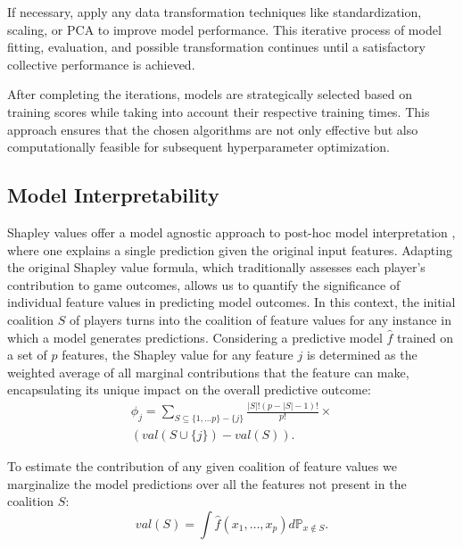 \documentclass{IEEEtran}
\begin{document}
            If necessary, apply any data transformation techniques like standardization, scaling, or PCA to improve model performance. This iterative process of model fitting, evaluation, and possible transformation continues until a satisfactory collective performance is achieved.

            After completing the iterations, models are strategically selected based on training scores while taking into account their respective training times. This approach ensures that the chosen algorithms are not only effective but also computationally feasible for subsequent hyperparameter optimization.

        \subsection{Model Interpretability} \label{sec:interpretability}

            Shapley values offer a model agnostic approach to post-hoc model interpretation \cite{chen2023algorithms}, where one explains a single prediction given the original input features. Adapting the original Shapley value formula, which traditionally assesses each player's contribution to game outcomes, allows us to quantify the significance of individual feature values in predicting model outcomes. In this context, the initial coalition $S$ of players turns into the coalition of feature values for any instance in which a model generates predictions. Considering a predictive model $\hat{f}$ trained on a set of $p$ features, the Shapley value for any feature $j$ is determined as the weighted average of all marginal contributions that the feature can make, encapsulating its unique impact on the overall predictive outcome:
            \begin{multline}
                \phi_j = \sum_{S \subseteq \{1, \dots p\} - \{j\}} \frac{ |S|! (p - |S| - 1)! }{p!} \times \\
                (val(S \cup \{j\}) - val(S)).
            \end{multline}

            To estimate the contribution of any given coalition of feature values we marginalize the model predictions over all the features not present in the coalition $S$:
            \begin{equation}
                val(S) = \int \hat{f}(x_1, \dots, x_p) d\mathbb{P}_{x \notin S}.
            \end{equation}
\end{document}
